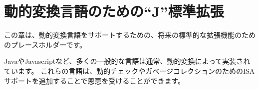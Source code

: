 \begin{comment}
\chapter{``J'' Standard Extension for Dynamically Translated Languages, Version 0.0}
\end{comment}
\chapter{動的変換言語のための``J''標準拡張}
\label{sec:j}

\begin{comment}
This chapter is a placeholder for a future standard extension to
support dynamically translated languages.
\end{comment}
この章は、動的変換言語をサポートするための、将来の標準的な拡張機能のためのプレースホルダーです。

\begin{commentary}
\begin{comment}
  Many popular languages are usually implemented via dynamic
  translation, including Java and Javascript. These languages can
  benefit from additional ISA support for dynamic checks and garbage
  collection.
\end{comment}
JavaやJavascriptなど、多くの一般的な言語は通常、動的変換によって実装されています。
これらの言語は、動的チェックやガベージコレクションのためのISAサポートを追加することで恩恵を受けることができます。
\end{commentary}

